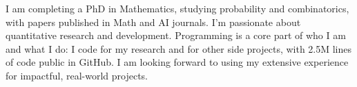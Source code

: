 \documentclass[11pt, letterpaper]{awesome-cv} %
\begin{document}
\makecvheader %



{\fontsize{9pt}{1em}\bodyfont\color{darktext} I am completing a PhD in Mathematics, studying probability and combinatorics, with papers published in Math and AI journals. I'm passionate about quantitative research and development. Programming is a core part of who I am and what I do: I code for my research and for other side projects, with 2.5M lines of code public in GitHub. I am looking forward to using my extensive experience for impactful, real-world projects.}




% 

% 

% 
\end{document}
